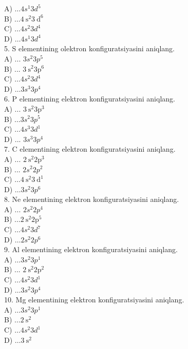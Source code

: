 A) $\ldots 4 s^{1} 3 d^{5}$\\
B) $\ldots 4 \mathrm{~s}^{2} 3 \mathrm{~d}^{6}$\\
C) $\ldots 4 s^{2} 3 d^{4}$\\
D) $\ldots 4 s^{1} 3 d^{4}$\\
5. S elementining olektron konfiguratsiyasini aniqlang.\\
A) ... $3 s^{2} 3 p^{5}$\\
B) ... $3 \mathrm{~s}^{2} 3 \mathrm{p}^{6}$\\
C) $\ldots 4 s^{2} 3 d^{4}$\\
D) $\ldots 3 s^{3} 3 p^{4}$\\
6. P elementining elektron konfiguratsiyasini aniqlang.\\
A) ... $3 \mathrm{~s}^{2} 3 \mathrm{p}^{3}$\\
B) $\ldots 3 s^{2} 3 p^{5}$\\
C) $\ldots 4 s^{3} 3 d^{1}$\\
D) ... $3 s^{3} 3 p^{4}$\\
7. C elementining elektron konfiguratsiyasini aniqlang.\\
A) ... $2 \mathrm{~s}^{2} 2 \mathrm{p}^{3}$\\
B) ... $2 s^{2} 2 p^{2}$\\
C) $\ldots 4 \mathrm{~s}^{2} 3 \mathrm{~d}^{1}$\\
D) $\ldots 3 s^{2} 3 p^{6}$\\
8. Ne elementining elektron konfiguratsiyasini aniqlang.\\
A) ... $2 s^{2} 2 p^{4}$\\
B) $\ldots 2 \mathrm{~s}^{2} 2 \mathrm{p}^{5}$\\
C) $\ldots 4 s^{2} 3 d^{7}$\\
D) $\ldots 2 s^{2} 2 p^{6}$\\
9. Al elementining elektron konfiguratsiyasini aniqlang.\\
A) $\ldots 3 s^{2} 3 p^{1}$\\
B) ... $2 \mathrm{~s}^{2} 2 \mathrm{p}^{2}$\\
C) $\ldots 4 s^{2} 3 d^{1}$\\
D) $\ldots 3 s^{2} 3 p^{4}$\\
10. Mg elementining elektron konfiguratsiyasini aniqlang.\\
A) $\ldots 3 s^{2} 3 p^{1}$\\
B) $\ldots 2 \mathrm{~s}^{2}$\\
C) $\ldots 4 s^{2} 3 d^{1}$\\
D) $\ldots 3 \mathrm{~s}^{2}$
